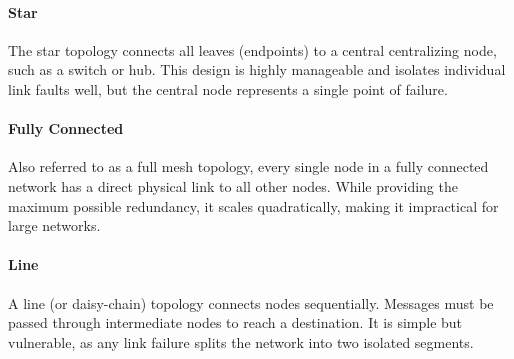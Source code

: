 \paragraph{Star}
The star topology connects all leaves (endpoints) to a central centralizing node, such as a switch or hub. This design is highly manageable and isolates individual link faults well, but the central node represents a single point of failure.
\begin{center}
\end{center}

\paragraph{Fully Connected}
Also referred to as a full mesh topology, every single node in a fully connected network has a direct physical link to all other nodes. While providing the maximum possible redundancy, it scales quadratically, making it impractical for large networks.
\begin{center}
\end{center}

\paragraph{Line}
A line (or daisy-chain) topology connects nodes sequentially. Messages must be passed through intermediate nodes to reach a destination. It is simple but vulnerable, as any link failure splits the network into two isolated segments.
\begin{center}
\end{center}

